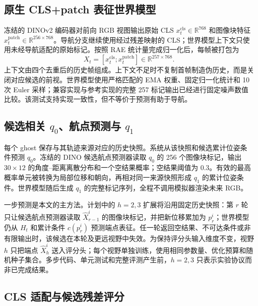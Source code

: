 \documentclass[UTF8,11pt]{ctexart}
\begin{document}
\subsection{原生 CLS+patch 表征世界模型}

冻结的 DINOv2 编码器对前向 RGB 视图输出原始 CLS $x_t^{\mathrm{cls}}\in\mathbb{R}^{768}$ 和图像块特征 $x_t^{\mathrm{patch}}\in\mathbb{R}^{256\times768}$\cite{oquab2023dinov2}。导航分支继续使用经过残差映射的 CLS；世界模型上下文只使用未经导航适配的原始标记。按照 RAE 统计量完成归一化后，每帧被打包为
\begin{equation}
X_t=[x_t^{\mathrm{cls}};x_t^{\mathrm{patch}}]\in\mathbb{R}^{257\times768}.
\end{equation}
上下文由四个去重后的历史帧组成。上下文不足时不复制首帧制造伪历史，而是关闭对应候选的前视。世界模型使用严格匹配的 EMA 权重、固定归一化统计和 10 次 Euler 采样；兼容实现与参考实现的完整 257 标记输出已经进行固定噪声数值比较。该测试支持实现一致性，但不等价于预测有助于导航。

\subsection{候选相关 $q_0$、航点预测与 $q_1$}

每个 ghost 保存与其轨迹来源对应的历史快照。系统从该快照和候选累计位姿条件预测 $q_0$。冻结的 DINO 候选航点预测器读取 $q_0$ 的 256 个图像块标记，输出 $30\times12$ 的角度--距离离散分布和一个空结果概率；空结果阈值为 0.3。有效的最高概率单元被转换为局部位移和朝向，再相对同一来源快照形成 $q_1$ 的累计位姿条件。世界模型随后生成 $q_1$ 的完整标记序列，全程不调用模拟器渲染未来 RGB。

一步预测是本文的主方法。计划中的 $h=2,3$ 扩展将沿用固定历史快照：第 $r$ 轮只让候选航点预测器读取 $\widehat{X}_{r-1}^{i}$ 的图像块标记，并把新位移累加为 $p_r^i$；世界模型仍从 $H_t$ 和累计条件 $c(p_r^i)$ 预测端点表征。任一轮返回空结果、不可达条件或非有限输出时，该候选在本轮及更远视野中失效。为保持评分头输入维度不变，视野 $h$ 只把端点 $\widehat{X}_{h}^{i}$ 送入评分头；每个视野单独训练，使用相同参数量、优化预算和随机种子集合。多步代码、单元测试和完整评测产生前，$h=2,3$ 只表示实验协议而非已完成结果。

\subsection{CLS 适配与候选残差评分}
\end{document}

